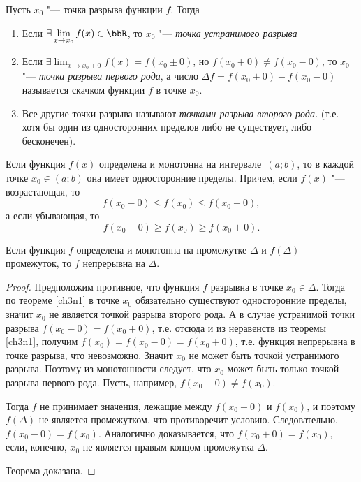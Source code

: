\begin{defn}
Пусть $x_0$ "--- точка разрыва функции $f$. Тогда 
\begin{enumerate}[wide, labelwidth=!, labelindent=0pt]
\item

Если $\exists \lim_{x \to x_0}\limits f(x) \in \bbR$, то $x_0$ "--- \textit{точка устранимого разрыва}
\item
Если $\exists \lim_{x \to x_0\pm0}\limits f(x)=f(x_0\pm 0)$, но $f(x_0+0)\ne f(x_0-0)$, то $x_0$ "--- \textit{точка разрыва первого рода}, а число $\Delta f=f(x_0+0)-f(x_0-0)$ называется скачком функции $f$ в точке $x_0$.
\item
Все другие точки разрыва называют \textit{точками разрыва второго рода.} (т.е. хотя бы один из односторонних пределов либо не существует, либо бесконечен).
\end{enumerate}
\end{defn}
\begin{thm} \label{ch3n1} 
Если функция $f(x)$ определена и монотонна на интервале~$(a;b)$, то в каждой точке $x_0\in(a;b)$ она имеет односторонние пределы. Причем, если $f(x)$ "--- возрастающая, то 
$$
f(x_0-0)\le f(x_0)\le f(x_0+0),
$$
а если убывающая, то
$$
f(x_0-0)\ge f(x_0)\ge f(x_0+0).
$$
\end{thm}
\begin{thm} \label{ch3n3} 
Если функция $f$ определена и монотонна на промежутке $\Delta$ и $f(\Delta)$ — промежуток, то $f$ непрерывна на $\Delta$.
\end{thm}
\begin{proof}
Предположим противное, что функция $f$ разрывна в точке $x_0 \in\Delta$. Тогда по \hyperref[ch3n1]{теореме \ref{ch3n1}} в точке $x_0$ обязательно существуют односторонние пределы, значит $x_0$ не является точкой разрыва второго рода.  А в случае устранимой точки разрыва $f(x_0-0)=f(x_0+0)$, т.е. отсюда и из неравенств из   \hyperref[ch3n1]{теоремы \ref{ch3n1}}, получим $f(x_0)=f(x_0-0)=f(x_0+0)$, т.е. функция непрерывна в точке разрыва, что невозможно. Значит $x_0$ не может быть точкой устранимого разрыва. Поэтому из монотонности следует, что $x_0$ может быть только точкой разрыва первого рода. Пусть, например, $f(x_0-0)\ne f(x_0)$.

Тогда $f$ не принимает значения, лежащие между $f(x_0 - 0)$ и $f(x_0)$, и поэтому $f(\Delta)$ не является промежутком, что противоречит условию. Следовательно, $f(x_0-0) = f(x_0)$. Аналогично доказывается, что  $f(x_0 + 0) = f(x_0)$, если, конечно, $x_0$ не является правым концом промежутка $\Delta$. 

Теорема доказана.
\end{proof} 